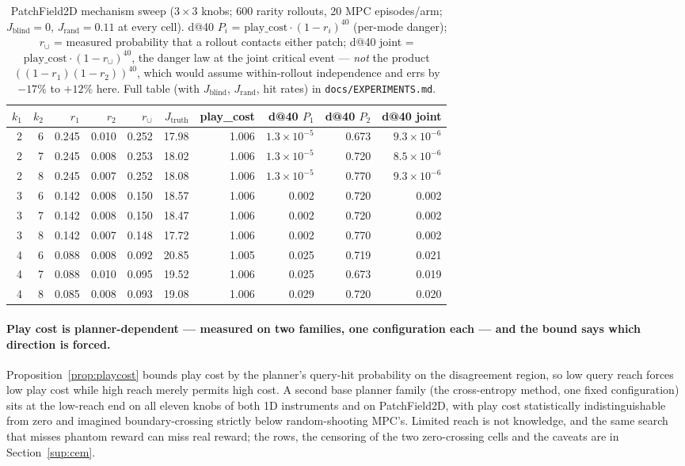 \documentclass[11pt]{article}
\theoremstyle{definition}
\theoremstyle{remark}
\begin{document}
\begin{table}[ht]
\centering
\small
\begin{tabular}{rrrrrrrrrr}
\toprule
$k_1$ & $k_2$ & $r_1$ & $r_2$ & $r_\cup$ & $J_\mathrm{truth}$ & play\_cost & d@40 $P_1$ & d@40 $P_2$ & d@40 joint \\
\midrule
2 & 6 & 0.245 & 0.010 & 0.252 & 17.98 & 1.006 & $1.3{\times}10^{-5}$ & 0.673 & $9.3{\times}10^{-6}$ \\
2 & 7 & 0.245 & 0.008 & 0.253 & 18.02 & 1.006 & $1.3{\times}10^{-5}$ & 0.720 & $8.5{\times}10^{-6}$ \\
2 & 8 & 0.245 & 0.007 & 0.252 & 18.08 & 1.006 & $1.3{\times}10^{-5}$ & 0.770 & $9.3{\times}10^{-6}$ \\
3 & 6 & 0.142 & 0.008 & 0.150 & 18.57 & 1.006 & 0.002 & 0.720 & 0.002 \\
3 & 7 & 0.142 & 0.008 & 0.150 & 18.47 & 1.006 & 0.002 & 0.720 & 0.002 \\
3 & 8 & 0.142 & 0.007 & 0.148 & 17.72 & 1.006 & 0.002 & 0.770 & 0.002 \\
4 & 6 & 0.088 & 0.008 & 0.092 & 20.85 & 1.005 & 0.025 & 0.719 & 0.021 \\
4 & 7 & 0.088 & 0.010 & 0.095 & 19.52 & 1.006 & 0.025 & 0.673 & 0.019 \\
4 & 8 & 0.085 & 0.008 & 0.093 & 19.08 & 1.006 & 0.029 & 0.720 & 0.020 \\
\bottomrule
\end{tabular}
\caption{PatchField2D mechanism sweep ($3\times3$ knobs; 600 rarity rollouts, 20 MPC episodes/arm; $J_\mathrm{blind} = 0$, $J_\mathrm{rand} = 0.11$ at every cell). d@40 $P_i$ = $\mathrm{play\_cost}\cdot(1-r_i)^{40}$ (per-mode danger); $r_\cup$ = measured probability that a rollout contacts either patch; d@40 joint = $\mathrm{play\_cost}\cdot(1-r_\cup)^{40}$, the danger law at the joint critical event --- \emph{not} the product $((1-r_1)(1-r_2))^{40}$, which would assume within-rollout independence and errs by $-17\%$ to $+12\%$ here. Full table (with $J_\mathrm{blind}$, $J_\mathrm{rand}$, hit rates) in \texttt{docs/EXPERIMENTS.md}.}
\label{tab:patch2d}
\end{table}

\paragraph{Play cost is planner-dependent --- measured on two families, one configuration each --- and the bound says which direction is forced.} Proposition~\ref{prop:playcost} bounds play cost by the planner's query-hit probability on the disagreement region, so low query reach forces low play cost while high reach merely permits high cost. A second base planner family (the cross-entropy method, one fixed configuration) sits at the low-reach end on all eleven knobs of both 1D instruments and on PatchField2D, with play cost statistically indistinguishable from zero and imagined boundary-crossing strictly below random-shooting MPC's. Limited reach is not knowledge, and the same search that misses phantom reward can miss real reward; the rows, the censoring of the two zero-crossing cells and the caveats are in Section~\ref{sup:cem}.
\end{document}
